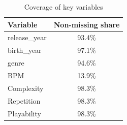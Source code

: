 \begin{table}[H]
\centering
\caption{Coverage of key variables}
\label{tab:coverage}
\begin{tabular}{lc}
\toprule
Variable & Non-missing share \\
\midrule
release\_year & 93.4\% \\
birth\_year & 97.1\% \\
genre & 94.6\% \\
BPM & 13.9\% \\
Complexity & 98.3\% \\
Repetition & 98.3\% \\
Playability & 98.3\% \\
\bottomrule
\end{tabular}
\end{table}
